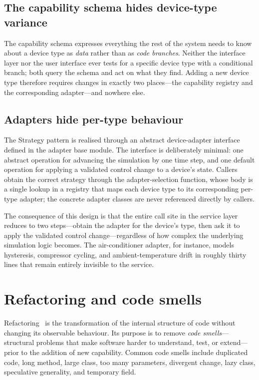 \subsection{The capability schema hides device-type variance}

The capability schema expresses everything the rest of the system needs to know about a
device type as \emph{data} rather than as \emph{code branches}. Neither the interface
layer nor the user interface ever tests for a specific device type with a conditional
branch; both query the schema and act on what they find. Adding a new device type
therefore requires changes in exactly two places---the capability registry and the
corresponding adapter---and nowhere else.

\subsection{Adapters hide per-type behaviour}

The Strategy pattern is realised through an abstract device-adapter interface defined
in the adapter base module. The interface is deliberately minimal: one abstract
operation for advancing the simulation by one time step, and one default operation for
applying a validated control change to a device's state. Callers obtain the correct
strategy through the adapter-selection function, whose body is a single lookup in a
registry that maps each device type to its corresponding per-type adapter; the concrete
adapter classes are never referenced directly by callers.

\label{lst:adapter}%
The consequence of this design is that the entire call site in the service layer
reduces to two steps---obtain the adapter for the device's type, then ask it to apply
the validated control change---regardless of how complex the underlying simulation logic
becomes. The air-conditioner adapter, for instance, models hysteresis, compressor
cycling, and ambient-temperature drift in roughly thirty lines that remain entirely
invisible to the service.

\section{Refactoring and code smells}
\label{sec:refactoring}

Refactoring~\cite{fowler} is the transformation of the internal structure of
code without changing its observable behaviour. Its purpose is to remove \emph{code
smells}---structural problems that make software harder to understand, test, or
extend---prior to the addition of new capability. Common code smells
include duplicated code, long method, large class, too many parameters,
divergent change, lazy class, speculative generality, and temporary field.

